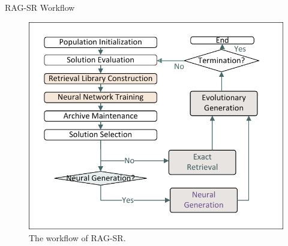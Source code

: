\documentclass[final]{beamer}
\newlength{\onecolwid}
\begin{document}
\begin{frame}[t]
\begin{columns}[t]
\begin{column}{\onecolwid}
%



                \begin{block}{RAG-SR Workflow}
                    \begin{figure}
                        \centering
                        \includegraphics[width=0.75\linewidth, trim=10 15 10 15, clip]{figs/Flow.pdf}
                        \caption{The workflow of RAG-SR.}
                    \end{figure}


\end{block}
\end{column}
\end{columns}
\end{frame}
\end{document}
